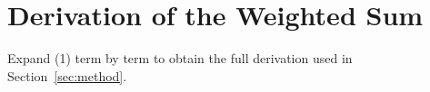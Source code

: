 \documentclass[journal,10pt]{IEEEtran}
\begin{document}
\appendices
\section{Derivation of the Weighted Sum}
\label{app:derivation}
Expand (1) term by term to obtain the full derivation used in Section~\ref{sec:method}.




\end{document}
